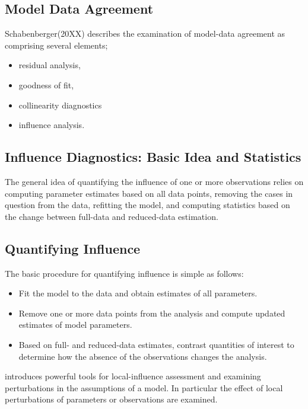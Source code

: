 \documentclass[Main.tex]{subfiles}
\begin{document}
	
	
	
	

	
	\subsection{Model Data Agreement}
	Schabenberger(20XX) describes the examination of model-data agreement as comprising several elements; \begin{itemize}
	\item residual analysis, 
	\item goodness of fit, 
	\item collinearity diagnostics
	\item influence analysis.
		\end{itemize}
	\subsection{Influence Diagnostics: Basic Idea and Statistics} %
	
	The general idea of quantifying the influence of one or more observations relies on computing parameter estimates based on all data points, removing the cases in question from the data, refitting the model, and computing statistics based on the change between full-data and reduced-data estimation. 
	
	
	
	
	\subsection{Quantifying Influence}  %
	
	The basic procedure for quantifying influence is simple as follows:
	
	\begin{itemize}
		\item Fit the model to the data and obtain estimates of all parameters.
		\item Remove one or more data points from the analysis and compute updated estimates of model parameters.
		\item Based on full- and reduced-data estimates, contrast quantities of interest to determine how the absence of the observations changes the analysis.
	\end{itemize}
	
	\citet{cook86} introduces powerful tools for local-influence assessment and examining perturbations in the assumptions of a model. In particular the effect of local perturbations of parameters or observations are examined.
	
\end{document}
